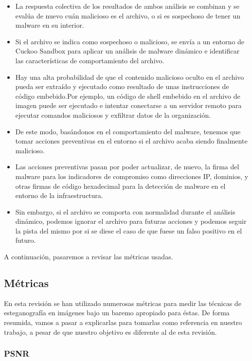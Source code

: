 \begin{itemize}
\item La respuesta colectiva de los resultados de ambos análisis se combinan y se evalúa de nuevo cuán malicioso es el archivo, o si es sospechoso de tener un malware en su interior.
\item Si el archivo se indica como sospechoso o malicioso, se envía a un entorno de Cuckoo Sandbox para aplicar un análisis de malware dinámico e identificar las características de comportamiento del archivo.%
\item Hay una alta probabilidad de que el contenido malicioso oculto en el archivo pueda ser extraído y ejecutado como resultado de unas instrucciones de código embebido.Por ejemplo, un código de shell embebido en el archivo de imagen puede ser ejecutado e intentar conectarse a un servidor remoto para ejecutar comandos maliciosos y exfiltrar datos de la organización.
\item De este modo, basándonos en el comportamiento del malware, tenemos que tomar acciones preventivas en el entorno si el archivo acaba siendo finalmente malicioso.
\item Las acciones preventivas pasan por poder actualizar, de nuevo, la firma del malware para los indicadores de compromiso como direcciones IP, dominios, y otras firmas de código hexadecimal para la detección de malware en el entorno de la infraestructura.
\item Sin embargo, si el archivo se comporta con normalidad durante el análisis dinámico, podemos ignorar el archivo para futuras acciones y podemos seguir la pista del mismo por si se diese el caso de que fuese un falso positivo en el futuro.
\end{itemize}

A continuación, pasaremos a revisar las métricas usadas.

\subsection{Métricas}

En esta revisión se han utilizado numerosas métricas para medir las técnicas de esteganografía en imágenes bajo un baremo apropiado para éstas. De forma resumida, vamos a pasar a explicarlas para tomarlas como referencia en nuestro trabajo, a pesar de que nuestro objetivo es diferente al de esta revisión.

\subsubsection{PSNR}

